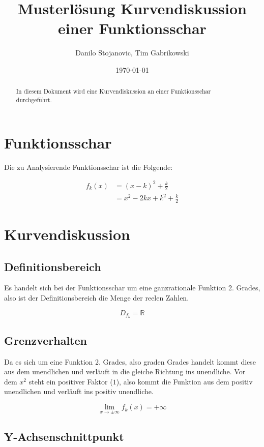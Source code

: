 \documentclass[12pt,a4paper]{article}
\title{Musterlösung Kurvendiskussion einer Funktionsschar}
\author{Danilo Stojanovic, Tim Gabrikowski}
\date{\today}
\begin{document}
\maketitle

\begin{abstract}
In diesem Dokument wird eine Kurvendiskussion an einer Funktionsschar durchgeführt. 
\end{abstract}

\newpage

\section{Funktionsschar}

Die zu Analysierende Funktionsschar ist die Folgende:

$$
\begin{aligned}
    f_k(x)&=(x-k)^2+\frac{k}{2} \\ 
    &= x^2 - 2kx + k^2 + \frac{k}{2}
\end{aligned}
$$

\section{Kurvendiskussion}

\subsection{Definitionsbereich}

Es handelt sich bei der Funktionsschar um eine ganzrationale Funktion 2. Grades, also ist der Definitionsbereich die Menge der reelen Zahlen.

$$
D_{f_k} = \mathbb{R}
$$

\subsection{Grenzverhalten}

Da es sich um eine Funktion 2. Grades, also graden Grades handelt kommt diese aus dem unendlichen und verläuft in die gleiche Richtung ins unendliche. Vor dem $x^2$ steht ein positiver Faktor ($1$), also kommt die Funktion aus dem positiv unendlichen und verläuft ins positiv unendliche.

$$
\lim_{x \to \pm \infty} f_k(x) = + \infty
$$

\subsection{Y-Achsenschnittpunkt}
\end{document}
